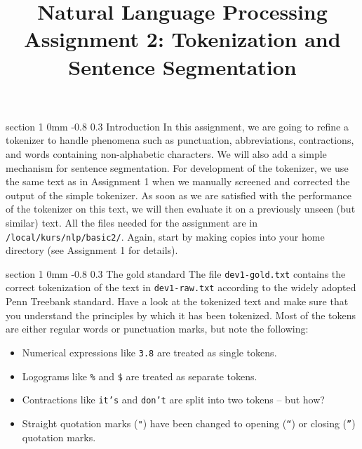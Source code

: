 \documentclass[11pt]{article}
\title{{\LARGE Natural Language Processing}\\[1.5mm]{\large Assignment 2: Tokenization and Sentence Segmentation}}
\author{}
\date{} %
\makeatletter
\newcommand{\newsec}[2]{\section{#1}\label{sec:#2}\noindent}
\renewcommand{\section}{\@startsection
{section}%
{1}%
{0mm}%
{-0.8\baselineskip}%
{0.3\baselineskip}%
{\bfseries\large}}%
\makeatother
\begin{document}
 

\maketitle
\vspace{-2mm} \newsec{Introduction}{intro}%
In this assignment, we are going to refine a tokenizer to handle
phenomena such as punctuation, abbreviations, contractions, and words
containing non-alphabetic characters. We will also add a simple
mechanism for sentence segmentation. For development of the tokenizer,
we use the same text as in Assignment 1 when we manually screened and
corrected the output of the simple tokenizer. As soon as we are
satisfied with the performance of the tokenizer on this text, we will
then evaluate it on a previously unseen (but similar) text. All the
files needed for the assignment are in {\tt
  /local/kurs/nlp/basic2/}. Again, start by making copies into your home
directory (see Assignment 1 for details).

\newsec{The gold standard}{gold}%
The file {\tt dev1-gold.txt} contains the correct tokenization of the
text in {\tt dev1-raw.txt} according to the widely adopted Penn
Treebank standard.  Have a look at the tokenized text and make sure
that you understand the principles by which it has been
tokenized. Most of the tokens are either regular words or punctuation
marks, but note the following:
\begin{itemize}[noitemsep,topsep=0.2cm]
\item Numerical expressions like {\tt 3.8} are treated as single
  tokens.
\item Logograms like {\tt \%} and {\tt \$} are treated as separate
  tokens.
\item Contractions like {\tt it's} and {\tt don't} are split into two
  tokens -- but how?
\item Straight quotation marks ({\tt "}) have been changed to opening
  ({\tt ``}) or closing ({\tt ''}) quotation marks.
\end{itemize}
\end{document}
